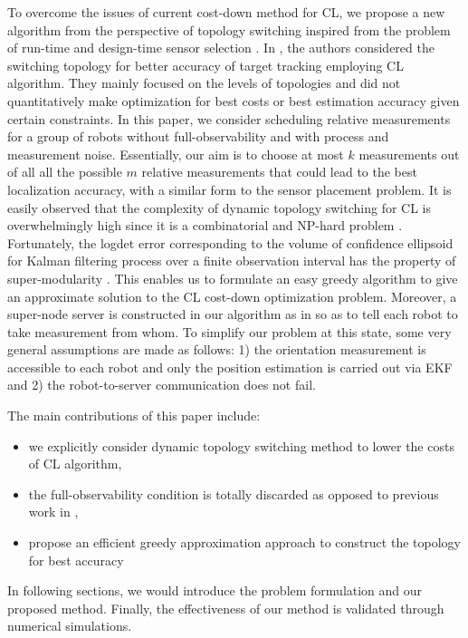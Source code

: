 \documentclass[conference]{IEEEtran}
\begin{document}
To overcome the issues of current cost-down method for CL, we propose a new algorithm from the perspective of topology switching inspired from the problem of run-time and design-time sensor selection \cite{vitus2012efficient,jawaid2015submodularity,tzoumas2016nearoptimal,tzoumas2016sensor,tzoumas2017scheduling,tzoumas2018selecting,zhang2017sensor,hausman2015cooperative}.
In \cite{hausman2015cooperative}, the authors considered the switching topology for better accuracy of	target tracking employing CL algorithm.
They mainly focused on the levels of topologies and did not quantitatively make optimization for best costs or best estimation accuracy given certain constraints.
In this paper, we consider scheduling relative measurements for a group of robots without full-observability and with process and measurement noise.
Essentially, our aim is to choose at most $k$ measurements out of all  all the possible $m$ relative measurements that could lead to the best localization accuracy, with a similar form to the sensor placement problem.
It is easily observed that the complexity of dynamic topology switching for CL is overwhelmingly high since it is a combinatorial and NP-hard problem \cite{zhang2017sensor}.
Fortunately, the logdet error corresponding to the volume of confidence ellipsoid for Kalman filtering process over a finite observation interval has the property of super-modularity \cite{tzoumas2016sensor}.
This enables us to formulate an easy greedy algorithm to give an approximate solution to the CL cost-down optimization problem. 
Moreover, a super-node server is constructed in our algorithm as in \cite{kia2018serverassisted} so as to tell each robot to take measurement from whom.
To simplify our problem at this state, some very general assumptions are made as follows: 1) the orientation measurement is accessible to each robot and only the position estimation is carried out via EKF and 2) the robot-to-server communication does not fail.

The main contributions of this paper include:
\begin{itemize}
	\item we explicitly consider dynamic topology switching method to lower the costs of CL algorithm,
	\item the full-observability condition is totally discarded as opposed to previous work in \cite{mourikis2006optimal,chang2018optimal},
	\item propose an efficient greedy approximation approach to construct the topology for best accuracy
\end{itemize}
In following sections, we would introduce the problem formulation and our proposed method.
Finally, the effectiveness of our method is validated through numerical simulations.
\end{document}
